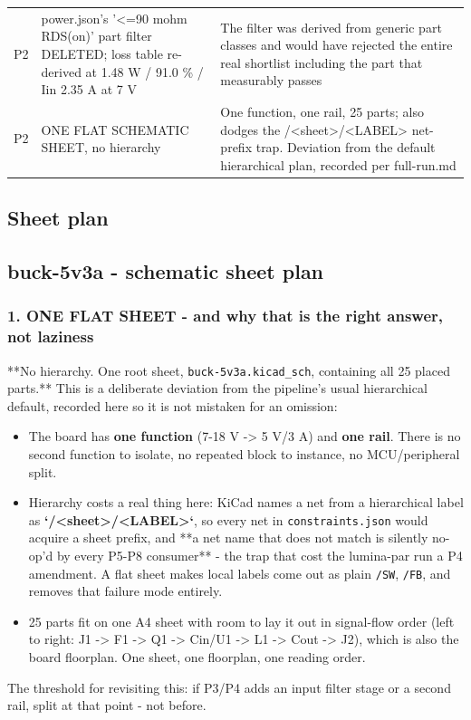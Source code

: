 \documentclass[11pt,a4paper]{article}
\begin{document}
{\begin{longtable}{lp{5.2cm}p{7.2cm}}
P2 & power.json's '\textless{}=90 mohm RDS(on)' part filter DELETED; loss table re-derived at 1.48 W / 91.0 \% / Iin 2.35 A at 7 V & The filter was derived from generic part classes and would have rejected the entire real shortlist including the part that measurably passes \\
P2 & ONE FLAT SCHEMATIC SHEET, no hierarchy & One function, one rail, 25 parts; also dodges the /\textless{}sheet\textgreater{}/\textless{}LABEL\textgreater{} net-prefix trap. Deviation from the default hierarchical plan, recorded per full-run.md \\
\bottomrule
\end{longtable}
}
\subsection*{Sheet plan}
\subsection*{buck-5v3a - schematic sheet plan}
\subsubsection*{1. ONE FLAT SHEET - and why that is the right answer, not laziness}
{*}{*}No hierarchy. One root sheet, \texttt{buck-5v3a.kicad\_sch}, containing all 25 placed parts.{*}{*} This is a deliberate deviation from the pipeline's usual hierarchical default, recorded here so it is not mistaken for an omission:

\begin{itemize}
\item The board has \textbf{one function} (7-18 V -\textgreater{} 5 V/3 A) and \textbf{one rail}. There is no
second function to isolate, no repeated block to instance, no MCU/peripheral split.
\item Hierarchy costs a real thing here: KiCad names a net from a hierarchical label as
\textbf{`/\textless{}sheet\textgreater{}/\textless{}LABEL\textgreater{}`}, so every net in \texttt{constraints.json} would acquire a sheet
prefix, and {*}{*}a net name that does not match is silently no-op'd by every P5-P8
consumer{*}{*} - the trap that cost the lumina-par run a P4 amendment. A flat sheet
makes local labels come out as plain \texttt{/SW}, \texttt{/FB}, and removes that failure mode
entirely.
\item 25 parts fit on one A4 sheet with room to lay it out in signal-flow order
(left to right: J1 -\textgreater{} F1 -\textgreater{} Q1 -\textgreater{} Cin/U1 -\textgreater{} L1 -\textgreater{} Cout -\textgreater{} J2), which is also the
board floorplan. One sheet, one floorplan, one reading order.
\end{itemize}
The threshold for revisiting this: if P3/P4 adds an input filter stage or a second rail, split at that point - not before.
\end{document}
